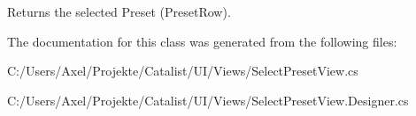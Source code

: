 Returns the selected Preset (Preset\+Row). 



The documentation for this class was generated from the following files\+:\begin{DoxyCompactItemize}
\item 
C\+:/\+Users/\+Axel/\+Projekte/\+Catalist/\+U\+I/\+Views/Select\+Preset\+View.\+cs\item 
C\+:/\+Users/\+Axel/\+Projekte/\+Catalist/\+U\+I/\+Views/Select\+Preset\+View.\+Designer.\+cs\end{DoxyCompactItemize}
